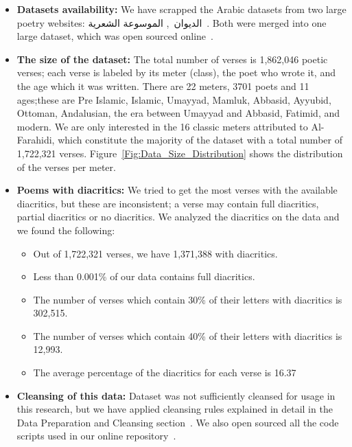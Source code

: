 \begin{itemize}

 \item \textbf{Datasets availability:} We have scrapped the Arabic datasets from two large poetry websites: \textarabic{الديوان}~\cite{diwan}, \textarabic{الموسوعة الشعرية}~\cite{PoetryEncyclopedia2016}. Both were merged into one large dataset, which was open sourced online~\cite{ArabicpoetryDS}.

 \item \textbf{The size of the dataset:} The total number of verses is 1,862,046 poetic verses; each verse is labeled by its meter (class), the poet who wrote it, and the age which it was written. There are 22 meters, 3701 poets and 11 ages;these are Pre Islamic, Islamic, Umayyad, Mamluk, Abbasid, Ayyubid, Ottoman, Andalusian, the era between Umayyad and Abbasid, Fatimid, and modern. We are only interested in the 16 classic meters attributed to Al-Farahidi, which constitute the majority of the dataset with a total number of 1,722,321 verses. Figure~\ref{Fig:Data_Size_Distribution} shows the distribution of the verses per meter.
 
  \item \textbf{Poems with diacritics:} We tried to get the most verses with the available diacritics, but these are inconsistent; a verse may contain full diacritics, partial diacritics or no diacritics. We analyzed the diacritics on the data and we found the following:
  \begin{itemize}
  	\item Out of 1,722,321 verses, we have 1,371,388 with diacritics.
  	\item Less than 0.001\% of our data contains full diacritics.
  	\item The number of verses which contain 30\% of their letters with diacritics is 302,515.
  	\item The number of verses which contain 40\% of their letters with diacritics is 12,993.
  	\item The average percentage of the diacritics for each verse is 16.37%
  	
  	
  \end{itemize}

 
 \item \textbf{Cleansing of this data:} Dataset was not sufficiently cleansed for usage in this research, but we have applied cleansing rules explained in detail in the Data Preparation and Cleansing section~. We also open sourced all the code scripts used in our online repository~\cite{HCILAB_ArabicPoetry_2018}.
\end{itemize}

